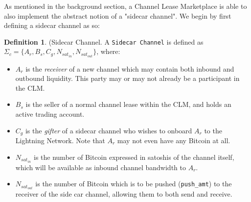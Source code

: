 \documentclass[10pt,a4paper]{article}
\theoremstyle{definition}
\newtheorem{definition}{Definition}[section]
\begin{document}
As mentioned in the background section, a Channel Lease Marketplace is able to
also implement the abstract notion of a "sidecar channel". We begin by first
defining a sidecar channel as so:

\theoremstyle{definition}

\begin{definition}{(Sidecar Channel.} 
    A \texttt{Sidecar Channel} is defined as $\Sigma_c = \{A_{r}, B_{s}, C_{g},
    N_{sat_{in}}, N_{sat_{out}}\}$, where:
\end{definition}
\begin{itemize}
    \item $A_{r}$ is the \emph{receiver} of a new channel which may contain both
        inbound and outbound liquidity. This party may or may not already be a
        participant in the CLM.

    \item $B_{s}$ is the seller of a normal channel lease within the CLM, and
        holds an active trading account.

    \item $C_{g}$ is the \emph{gifter} of a sidecar channel who wishes to onboard
        $A_{r}$ to the Lightning Network. Note that $A_{r}$ may not even have any
        Bitcoin at all.

    \item $N_{sat_{in}}$ is the number of Bitcoin expressed in satoshis of the
        channel itself, which will be available as inbound channel bandwidth to
        $A_{r}$.

    \item $N_{sat_{out}}$ is the number of Bitcoin which is to be pushed
        \cite{bolt2} (\texttt{push\_amt}) to the receiver of the side car
        channel, allowing them to both send and receive.

\end{itemize}
\end{document}
